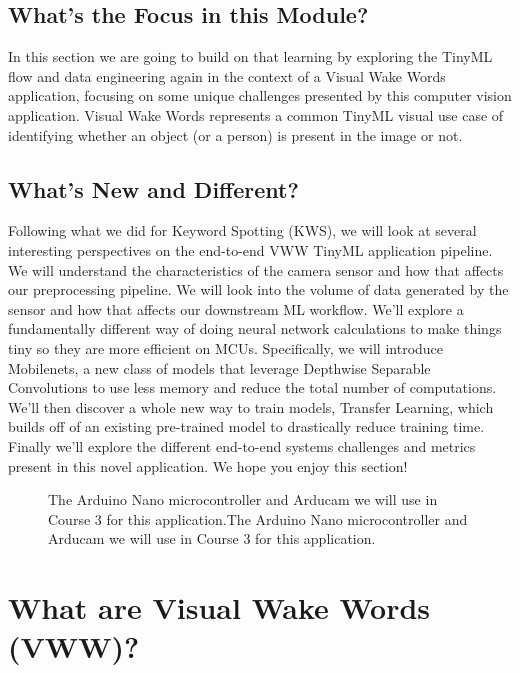   
  
  \subsection{What's the Focus in this Module?}
  
  In this section we are going to build on that learning by exploring the TinyML flow and data engineering again in the context of a Visual Wake Words application, focusing on some unique challenges presented by this computer vision application. Visual Wake Words represents a common TinyML visual use case of identifying whether an object (or a person) is present in the image or not.
  
  \subsection{What's New and Different?}
  
  Following what we did for Keyword Spotting (KWS), we will look at several interesting perspectives on the end-to-end VWW TinyML application pipeline. We will understand the characteristics of the camera sensor and how that affects our preprocessing pipeline. We will look into the volume of data generated by the sensor and how that affects our downstream ML workflow. We’ll explore a fundamentally different way of doing neural network calculations to make things tiny so they are more efficient on MCUs. Specifically, we will introduce Mobilenets, a new class of models that leverage Depthwise Separable Convolutions to use less memory and reduce the total number of computations. We’ll then discover a whole new way to train models, Transfer Learning, which builds off of an existing pre-trained model to drastically reduce training time. Finally we’ll explore the different end-to-end systems challenges and metrics present in this novel application. We hope you enjoy this section!
  
    \begin{figure}
      \caption{The Arduino Nano microcontroller and Arducam we will use in Course 3 for this application.The Arduino Nano microcontroller and Arducam we will use in Course 3 for this application.}
  \end{figure}  
  
  
  
  \section{What are Visual Wake Words (VWW)?}
  
